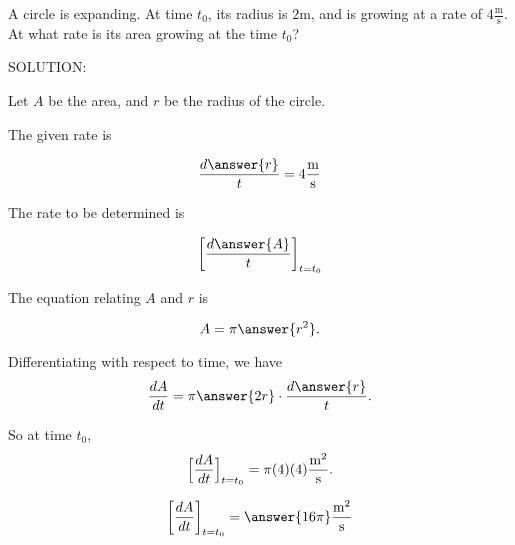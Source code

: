 \documentclass{ximera}
\author{Steven Gubkin\and Nela Lakos}
\begin{document}
\begin{exercise}

A circle is expanding.  At time $t_0$, its radius is $2 \textrm{m}$,
and is growing at a rate of $4 \frac{\textrm{m}}{\textrm{s}}$.  At
what rate is its area growing at the time $t_0$?

SOLUTION:  


  Let $A$ be the area, and $r$ be the radius of the circle. 
  
  The given rate is
  
   \[
\frac{d\answer{r}}{t} =4\frac{\textrm{m}}{\textrm{s}}
  \]
  
  
  The rate to be determined is 
  
   \[
 \left[\frac{d\answer{A}}{t}\right]_  {t=t_0} 
  \]
  
   The equation relating $A$ and $r$ is
  
  
  \[
  A = \pi \answer{r^2}.
  \]



  Differentiating with respect to time, we have
  \[
  \frac{dA}{dt} = \pi\answer{2 r }\cdot\frac{d\answer{r}}{t}.
  \]


\begin{hint}
  So at time $t_0$,
  \[
  \Bigl[\frac{dA}{dt}\Bigr]_  {t=t_0} = \pi (4) (4) \frac{\textrm{m}^2}{\textrm{s}}.
  \]
\end{hint}

\begin{prompt}
  \[
 \left[\frac{dA}{dt}\right]_  {t=t_0}  = \answer{16\pi}\frac{\textrm{m}^2}{\textrm{s}}
  \]
\end{prompt}

\end{exercise}
\end{document}
